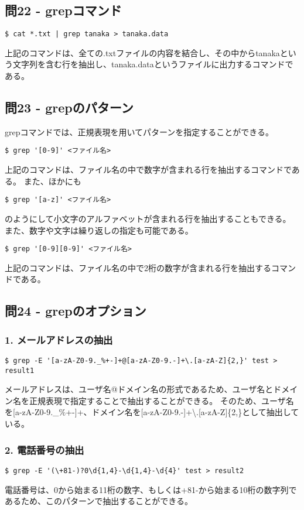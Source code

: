 \documentclass[a4paper,11pt]{jsarticle}
\begin{document}
\subsection*{問22 - grepコマンド}
\begin{lstlisting}[caption=問22の解答]
    $ cat *.txt | grep tanaka > tanaka.data
\end{lstlisting}
上記のコマンドは、全ての.txtファイルの内容を結合し、その中からtanakaという文字列を含む行を抽出し、tanaka.dataというファイルに出力するコマンドである。

\subsection*{問23 - grepのパターン}
grepコマンドでは、正規表現を用いてパターンを指定することができる。
\begin{lstlisting}[caption=問23の解答]
    $ grep '[0-9]' <ファイル名>
\end{lstlisting}
上記のコマンドは、ファイル名の中で数字が含まれる行を抽出するコマンドである。
また、ほかにも
\begin{lstlisting}[caption=問23の解答]
    $ grep '[a-z]' <ファイル名>
\end{lstlisting}
のようにして小文字のアルファベットが含まれる行を抽出することもできる。
また、数字や文字は繰り返しの指定も可能である。
\begin{lstlisting}[caption=問23の解答]
    $ grep '[0-9][0-9]' <ファイル名>
\end{lstlisting}
上記のコマンドは、ファイル名の中で2桁の数字が含まれる行を抽出するコマンドである。

\subsection*{問24 - grepのオプション}
\subsubsection*{1. メールアドレスの抽出}
\begin{lstlisting}[caption=問24-1の解答]
    $ grep -E '[a-zA-Z0-9._%+-]+@[a-zA-Z0-9.-]+\.[a-zA-Z]{2,}' test > result1
\end{lstlisting}
メールアドレスは、ユーザ名@ドメイン名の形式であるため、ユーザ名とドメイン名を正規表現で指定することで抽出することができる。
そのため、ユーザ名を[a-zA-Z0-9.\_\%+-]+、ドメイン名を[a-zA-Z0-9.-]+\textbackslash.[a-zA-Z]\{2,\}として抽出している。

\subsubsection*{2. 電話番号の抽出}
\begin{lstlisting}[caption=問24-2の解答]
    $ grep -E '(\+81-)?0\d{1,4}-\d{1,4}-\d{4}' test > result2
\end{lstlisting}
電話番号は、0から始まる11桁の数字、もしくは+81-から始まる10桁の数字列であるため、このパターンで抽出することができる。
\end{document}

